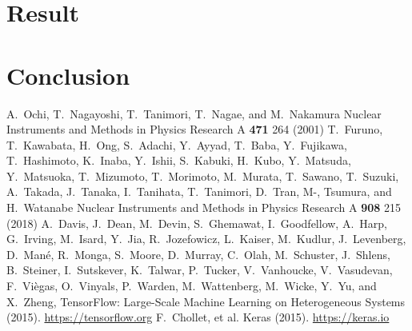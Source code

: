 \documentclass{jps-cp}
\begin{document}
\section{Result}

\section{Conclusion}


\begin{thebibliography}{9}
  A.~Ochi, T.~Nagayoshi, T.~Tanimori, T.~Nagae, and M.~Nakamura
  Nuclear Instruments and Methods in Physics Research A \textbf{471} 264 (2001)
  T.~Furuno, T.~Kawabata, H.~Ong, S.~Adachi, Y.~Ayyad, T.~Baba, Y.~Fujikawa, T.~Hashimoto, K.~Inaba, Y.~Ishii,
  S.~Kabuki, H.~Kubo, Y.~Matsuda, Y.~Matsuoka, T.~Mizumoto, T.~Morimoto, M.~Murata, T.~Sawano, T.~Suzuki, A.~Takada,
  J.~Tanaka, I.~Tanihata, T.~Tanimori, D.~Tran, M-, Tsumura, and H.~Watanabe
  Nuclear Instruments and Methods in Physics Research A \textbf{908} 215 (2018)
  A.~Davis, J.~Dean, M.~Devin, S.~Ghemawat, I.~Goodfellow, A.~Harp, G.~Irving,
  M.~Isard, Y.~Jia, R.~Jozefowicz, L.~Kaiser, M.~Kudlur, J.~Levenberg,
  D.~Man\'{e}, R.~Monga, S.~Moore, D.~Murray, C.~Olah, M.~Schuster, J.~Shlens,
  B.~Steiner, I.~Sutskever, K.~Talwar, P.~Tucker, V.~Vanhoucke, V.~Vasudevan,
  F.~Vi\`{e}gas, O.~Vinyals, P.~Warden, M.~Wattenberg, M.~Wicke, Y.~Yu, and
  X.~Zheng, {TensorFlow: Large-Scale Machine Learning on Heterogeneous Systems} (2015).
  \url{https://tensorflow.org}
  F.~Chollet, et al. {Keras} (2015). \url{https://keras.io}

\end{thebibliography}
\end{document}
